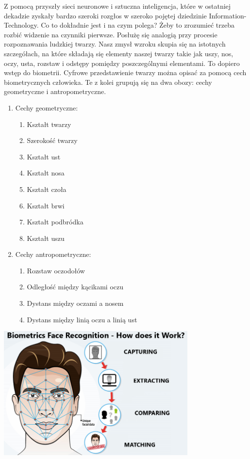 \documentclass{article}
\begin{document}
\par
Z pomocą przyszły sieci neuronowe i sztuczna inteligencja, które w ostatniej dekadzie zyskały bardzo szeroki rozgłos w szeroko pojętej dziedzinie Information-Technology. Co to dokładnie jest i na czym polega? Żeby to zrozumieć trzeba rozbić widzenie na czynniki pierwsze. Posłużę się analogią przy procesie rozpoznawania ludzkiej twarzy. Nasz zmysł wzroku skupia się na istotnych szczegółach, na które składają się elementy naszej twarzy takie jak uszy, nos, oczy, usta, rozstaw i odstępy pomiędzy poszczególnymi elementami. To dopiero wstęp do biometrii. Cyfrowe przedstawienie twarzy można opisać za pomocą cech biometrycznych człowieka. Te z kolei grupują się na dwa obozy: cechy geometryczne i antropometryczne.
\begin{enumerate}
	\item Cechy geometryczne:
		\begin{enumerate}
			\item Kształt twarzy
			\item Szerokość twarzy
			\item Kształt ust
			\item Kształt nosa
			\item Kształt czoła
			\item Kształt brwi
			\item Kształt podbródka
			\item Kształt uszu
		\end{enumerate}
	\item Cechy antropometryczne:
		\begin{enumerate}
			\item Rozstaw oczodołów
			\item Odległość między kącikami oczu
			\item Dystans między oczami a nosem
			\item Dystans między linią oczu a linią ust
		\end{enumerate}
\end{enumerate}
\begin{center}
	\includegraphics[width=10cm]{face}
\end{center}
\end{document}
